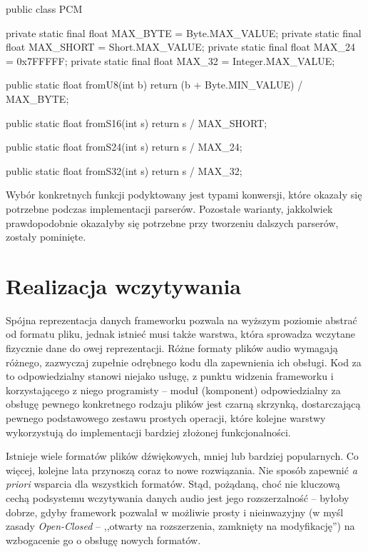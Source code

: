 \begin{java}
public class PCM {

    private static final float MAX_BYTE = Byte.MAX_VALUE;
    private static final float MAX_SHORT = Short.MAX_VALUE;
    private static final float MAX_24 = 0x7FFFFF;
    private static final float MAX_32 = Integer.MAX_VALUE;

    public static float fromU8(int b) {
        return (b + Byte.MIN_VALUE) / MAX_BYTE;
    }

    public static float fromS16(int s) {
        return s / MAX_SHORT;
    }
    
    public static float fromS24(int s) {
        return s / MAX_24;
    }
    
    public static float fromS32(int s) {
        return s / MAX_32;
    }

}
\end{java}

Wybór konkretnych funkcji podyktowany jest typami konwersji, które okazały się potrzebne podczas
implementacji parserów. Pozostałe warianty, jakkolwiek prawdopodobnie okazałyby się potrzebne przy
tworzeniu dalszych parserów, zostały pominięte.


\section{Realizacja wczytywania}

Spójna reprezentacja danych frameworku pozwala na wyższym poziomie abstrać od formatu pliku, jednak
istnieć musi także warstwa, która sprowadza wczytane fizycznie dane do owej reprezentacji. Różne
formaty plików audio wymagają różnego, zazwyczaj zupełnie odrębnego kodu dla zapewnienia ich
obsługi. Kod za to odpowiedzialny stanowi niejako usługę, z punktu widzenia frameworku i
korzystającego z niego programisty -- moduł (komponent) odpowiedzialny za obsługę pewnego
konkretnego rodzaju plików jest czarną skrzynką, dostarczającą pewnego podstawowego zestawu prostych
operacji, które kolejne warstwy wykorzystują do implementacji bardziej złożonej funkcjonalności.

Istnieje wiele formatów plików dźwiękowych, mniej lub bardziej popularnych. Co więcej, kolejne lata
przynoszą coraz to nowe rozwiązania. Nie sposób zapewnić \textit{a priori} wsparcia dla wszystkich
formatów. Stąd, pożądaną, choć nie kluczową cechą podsystemu wczytywania danych audio jest jego
rozszerzalność -- byłoby dobrze, gdyby framework pozwalał w możliwie prosty i nieinwazyjny (w myśl
zasady \emph{Open-Closed} -- ,,otwarty na rozszerzenia, zamknięty na modyfikację'') na wzbogacenie
go o obsługę nowych formatów.

